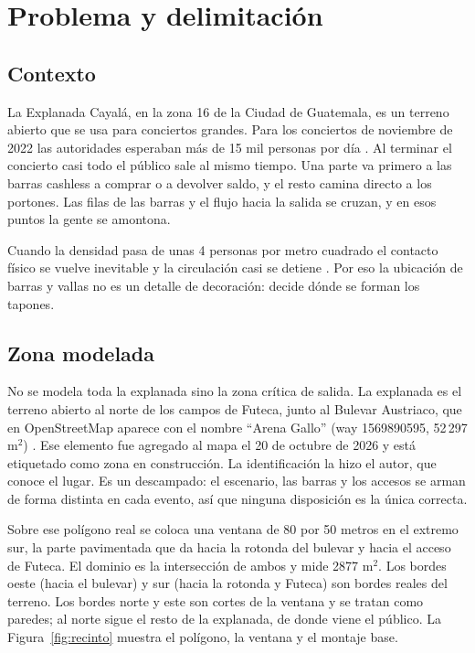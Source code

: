 \documentclass[11pt,letterpaper]{article}
\begin{document}
\section{Problema y delimitaci\'on}

\subsection{Contexto}
La Explanada Cayal\'a, en la zona 16 de la Ciudad de Guatemala, es un terreno abierto que se usa para conciertos grandes. Para los conciertos de noviembre de 2022 las autoridades esperaban m\'as de 15 mil personas por d\'ia \citep{prensalibre2022}. Al terminar el concierto casi todo el p\'ublico sale al mismo tiempo. Una parte va primero a las barras cashless a comprar o a devolver saldo, y el resto camina directo a los portones. Las filas de las barras y el flujo hacia la salida se cruzan, y en esos puntos la gente se amontona.

Cuando la densidad pasa de unas 4 personas por metro cuadrado el contacto f\'isico se vuelve inevitable y la circulaci\'on casi se detiene \citep{fruin1971}. Por eso la ubicaci\'on de barras y vallas no es un detalle de decoraci\'on: decide d\'onde se forman los tapones.

\subsection{Zona modelada}
No se modela toda la explanada sino la zona cr\'itica de salida. La explanada es el terreno abierto al norte de los campos de Futeca, junto al Bulevar Austriaco, que en OpenStreetMap aparece con el nombre ``Arena Gallo'' (way 1569890595, 52\,297 m$^2$) \citep{osm1569890595}. Ese elemento fue agregado al mapa el 20 de octubre de 2026 y est\'a etiquetado como zona en construcci\'on. La identificaci\'on la hizo el autor, que conoce el lugar. Es un descampado: el escenario, las barras y los accesos se arman de forma distinta en cada evento, as\'i que ninguna disposici\'on es la \'unica correcta.

Sobre ese pol\'igono real se coloca una ventana de 80 por 50 metros en el extremo sur, la parte pavimentada que da hacia la rotonda del bulevar y hacia el acceso de Futeca. El dominio es la intersecci\'on de ambos y mide 2877 m$^2$. Los bordes oeste (hacia el bulevar) y sur (hacia la rotonda y Futeca) son bordes reales del terreno. Los bordes norte y este son cortes de la ventana y se tratan como paredes; al norte sigue el resto de la explanada, de donde viene el p\'ublico. La Figura~\ref{fig:recinto} muestra el pol\'igono, la ventana y el montaje base.
\end{document}
